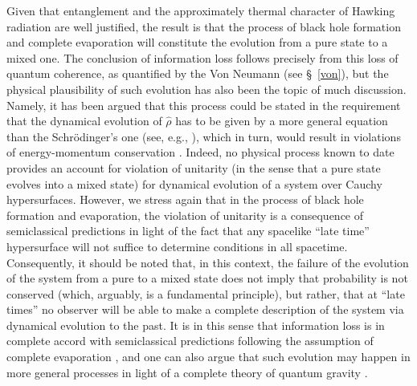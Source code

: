 \documentclass[
12pt,		%
openright,	%
twoside,  %
a4paper,			%
chapter=TITLE,		%
english,			%
french,				%
spanish,			%
brazil				%
]{USPSC-classe/USPSC}
\begin{document}
Given that entanglement and the approximately thermal character of Hawking radiation are well justified, the result is that the process of black hole formation and complete evaporation will constitute the evolution from a pure state to a mixed one. The conclusion of information loss follows precisely from this loss of quantum coherence, as quantified by the Von Neumann (see \S~\ref{von}), but the physical plausibility of such evolution has also been the topic of much discussion. Namely, it has been argued that this process could be stated in the requirement that the dynamical evolution of $\hat{\rho}$ has to be given by a more general equation than the Schrödinger's one (see, e.g., \cite{Sakurai1994}), which in turn, would result in violations of energy-momentum conservation \cite{Banks1984,Ellis1984}. Indeed, no physical process known to date provides an account for violation of unitarity (in the sense that a pure state evolves into a mixed state) for dynamical evolution of a system over Cauchy hypersurfaces. However, we stress again that in the process of black hole formation and evaporation, the violation of unitarity is a consequence of semiclassical predictions in light of the fact that any spacelike ``late time'' hypersurface will not suffice to determine conditions in all spacetime. Consequently, it should be noted that, in this context, the failure of the evolution of the system from a pure to a mixed state does not imply that probability is not conserved (which, arguably, is a fundamental principle), but rather, that at ``late times'' no observer will be able to make a complete description of the system via dynamical evolution to the past. It is in this sense that information loss is in complete accord with semiclassical predictions following the assumption of complete evaporation \cite{Unruh2017}, and one can also argue that such evolution may happen in more general processes in light of a complete theory of quantum gravity \cite{Unruh1995b}.
\end{document}
